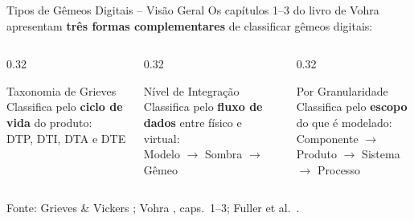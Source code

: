 \documentclass[aspectratio=169,xcolor=dvipsnames]{beamer}
\begin{document}
\begin{frame}{Tipos de Gêmeos Digitais -- Visão Geral}
    Os capítulos 1--3 do livro de Vohra \cite{vohra2022dt} apresentam \textbf{três formas complementares} de classificar gêmeos digitais:

    \vspace{0.6em}
    \begin{columns}[T]
        \begin{column}{0.32\textwidth}
            \begin{block}{Taxonomia de Grieves}
                Classifica pelo \textbf{ciclo de vida} do produto:\\[0.3em]
                DTP, DTI, DTA e DTE
            \end{block}
        \end{column}
        \begin{column}{0.32\textwidth}
            \begin{block}{Nível de Integração}
                Classifica pelo \textbf{fluxo de dados} entre físico e virtual:\\[0.3em]
                Modelo $\to$ Sombra $\to$ Gêmeo
            \end{block}
        \end{column}
         \begin{column}{0.32\textwidth}
            \begin{block}{Por Granularidade}
                Classifica pelo \textbf{escopo} do que é modelado:\\[0.3em]
                Componente $\to$ Produto $\to$ Sistema $\to$ Processo
            \end{block}
        \end{column}
    \end{columns}

    \vspace{0.6em}
    \footnotesize
    Fonte: Grieves \& Vickers \cite{grieves2017dt}; Vohra \cite{vohra2022dt}, caps.\ 1--3; Fuller et al.\ \cite{fuller2020dt}.
\end{frame}
\end{document}
